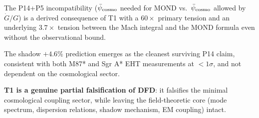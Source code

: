\documentclass[11pt]{article}
\newcommand{\psicosmo}{\bar{\psi}_{\rm cosmo}}
\begin{document}
The P14+P5 incompatibility ($\psicosmo$ needed for MOND vs.\ $\psicosmo$
allowed by $\dot{G}/G$) is a derived consequence of T1 with a $60\times$
primary tension and an underlying $3.7\times$ tension between the Mach integral
and the MOND formula even without the observational bound.

The shadow $+4.6\%$ prediction emerges as the cleanest surviving P14 claim,
consistent with both M87* and Sgr A* EHT measurements at $< 1\sigma$, and
not dependent on the cosmological sector.

\textbf{T1 is a genuine partial falsification of DFD}: it falsifies the minimal
cosmological coupling sector, while leaving the field-theoretic core (mode spectrum,
dispersion relations, shadow mechanism, EM coupling) intact.

\end{document}
